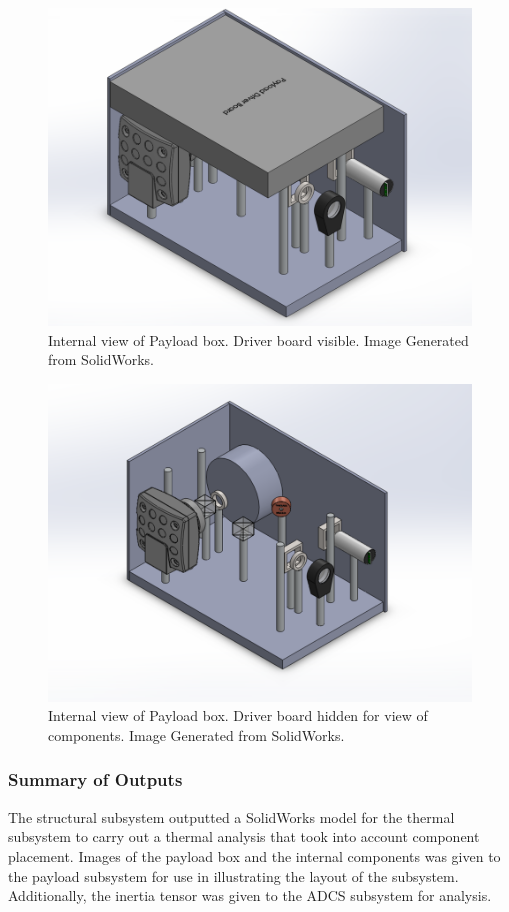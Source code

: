 \documentclass[12pt]{article}
\begin{document}
\begin{figure}[!ht]
\centering
\includegraphics[width=4.5in]{images/STR-10.png}
\caption{Internal view of Payload box. Driver board visible. Image Generated from SolidWorks.}
\label{fig:str-10}
\end{figure}

\begin{figure}[!ht]
\centering
\includegraphics[width=4.5in]{images/STR-11.png}
\caption{Internal view of Payload box. Driver board hidden for view of components. Image Generated from SolidWorks.}
\label{fig:str-11}
\end{figure}

\subsubsection{Summary of Outputs}
The structural subsystem outputted a SolidWorks model for the thermal subsystem to carry out a thermal analysis that took into account component placement.
Images of the payload box and the internal components was given to the payload subsystem for use in illustrating the layout of the subsystem.
Additionally, the inertia tensor was given to the ADCS subsystem for analysis.
\end{document}
